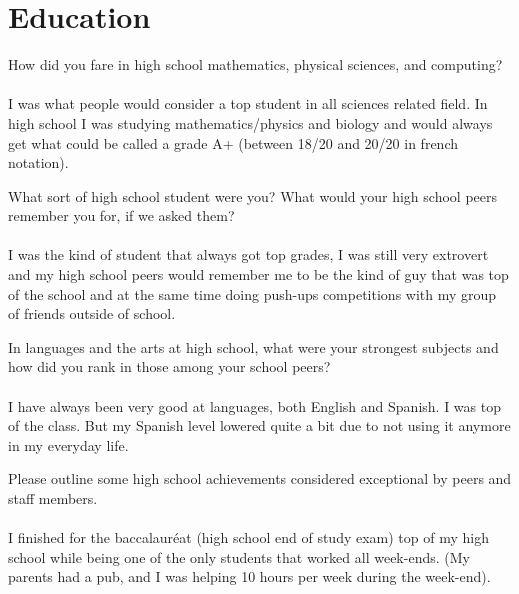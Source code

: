 \documentclass{exam}
\begin{document}
\begin{center}
\end{center}

\vspace{5mm}

\vspace{5mm}

\section*{Education}

\begin{questions}
\question How did you fare in high school mathematics, physical sciences, and computing?
\\~\\
I was what people would consider a top student in all sciences related field. 
In high school I was studying mathematics/physics and biology and would always get what could be called a grade A+ (between 18/20 and 20/20 in french notation).

\question What sort of high school student were you? What would your high school peers remember you for, if we asked them?
\\~\\
I was the kind of student that always got top grades, I was still very extrovert and my high school peers would remember me to be the kind of guy 
that was top of the school and at the same time doing push-ups competitions with my group of friends outside of school.

\question In languages and the arts at high school, what were your strongest subjects and how did you rank in those among your school peers?
\\~\\
I have always been very good at languages, both English and Spanish. I was top of the class.
But my Spanish level lowered quite a bit due to not using it anymore in my everyday life.


\question Please outline some high school achievements considered exceptional by peers and staff members.
\\~\\
I finished for the baccalauréat (high school end of study exam) top of my high school while being one of the only students that worked all week-ends.
(My parents had a pub, and I was helping 10 hours per week during the week-end).


\end{questions}
\end{document}
